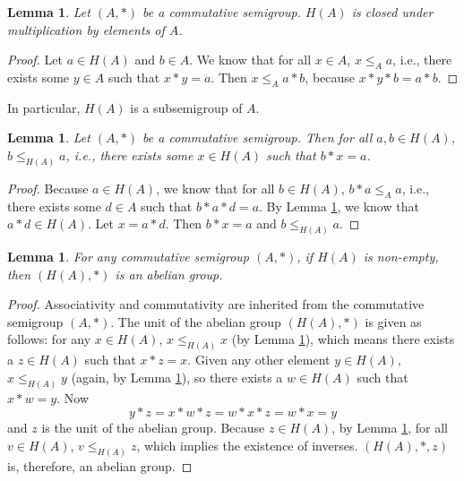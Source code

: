 \documentclass{msthesis}
\newtheorem{lemma}[theorem]{Lemma}
\theoremstyle{definition}
\begin{document}
\begin{lemma}\label{lemma:ha_closure}
    Let $(A, *)$ be a commutative semigroup. $H(A)$ is closed under multiplication by elements of $A$.
\end{lemma}

\begin{proof}
    Let $a \in H(A)$ and $b \in A$.  We know that for all $x \in A$, $x \le_A a$, i.e., there exists some $y \in A$ such that $x * y = a$.  Then $x \le_A a * b$, because $x * y * b = a * b$.
\end{proof}

In particular, $H(A)$ is a subsemigroup of $A$.
\begin{lemma}\label{lemma:clique}
    Let $(A, *)$ be a commutative semigroup.  Then for all $a, b \in H(A)$, $b \le_{H(A)} a$, i.e., there exists some $x \in H(A)$ such that $b * x = a$.
\end{lemma}

\begin{proof}
    Because $a \in H(A)$, we know that for all $b \in H(A)$, $b * a \le_A a$, i.e., there exists some $d \in A$ such that $b * a * d = a$.  By Lemma \ref{lemma:ha_closure}, we know that $a * d \in H(A)$.  Let $x = a * d$.  Then $b * x = a$ and  $b \le_{H(A)} a$.
\end{proof}

\begin{lemma}\label{lemma:HAabeliangroup}
    For any commutative semigroup $(A, *)$, if $H(A)$ is non-empty, then $(H(A), *)$ is an abelian group.
\end{lemma}

\begin{proof}
    Associativity and commutativity are inherited from the commutative semigroup $(A, *)$.  The unit of the abelian group $(H(A), *)$ is given as follows: for any $x \in H(A)$, $x \le_{H(A)} x$ (by Lemma \ref{lemma:clique}), which means there exists a $z \in H(A)$ such that $x * z = x$.  Given any other element $y \in H(A)$, $x \le_{H(A)} y$ (again, by Lemma \ref{lemma:clique}), so there exists a $w \in H(A)$ such that $x * w = y$.  Now
    \[ y * z = x * w * z = w * x * z = w * x = y\]
    \noindent
    and $z$ is the unit of the abelian group.  Because $z \in H(A)$, by Lemma \ref{lemma:clique}, for all $v \in H(A)$, $v \le_{H(A)} z$, which implies the existence of inverses.  $(H(A), *, z)$ is, therefore, an abelian group.
\end{proof}
\end{document}
